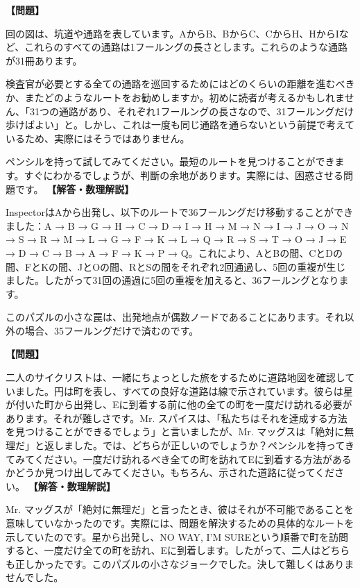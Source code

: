 \documentclass[10pt,a4paper,oneside,openany]{ltjsbook}
\begin{document}
\begin{tcolorbox}[colback=softblue,colframe=primaryblue,title=\textbf{第 247 問：INSPECTING A MINE.},arc=2mm,boxrule=1pt,breakable]
\textbf{【問題】}\par\vspace{0.3em}
回の図は、坑道や通路を表しています。AからB、BからC、CからH、HからIなど、これらのすべての通路は1フールングの長さとします。これらのような通路が31冊あります。

検査官が必要とする全ての通路を巡回するためにはどのくらいの距離を進むべきか、またどのようなルートをお勧めしますか。初めに読者が考えるかもしれません、「31つの通路があり、それぞれ1フールングの長さなので、31フールングだけ歩けばよい」と。しかし、これは一度も同じ通路を通らないという前提で考えているため、実際にはそうではありません。

ペンシルを持って試してみてください。最短のルートを見つけることができます。すぐにわかるでしょうが、判斷の余地があります。実際には、困惑させる問題です。
\tcblower
\textbf{【解答・数理解説】}\par\vspace{0.3em}
InspectorはAから出発し、以下のルートで36フールングだけ移動することができました：A → B → G → H → C → D → I → H → M → N → I → J → O → N → S → R → M → L → G → F → K → L → Q → R → S → T → O → J → E → D → C → B → A → F → K → P → Q。これにより、AとBの間、CとDの間、FとKの間、JとOの間、RとSの間をそれぞれ2回通過し、5回の重複が生じました。したがって31回の通過に5回の重複を加えると、36フールングとなります。

このパズルの小さな罠は、出発地点が偶数ノードであることにあります。それ以外の場合、35フールングだけで済むのです。
\end{tcolorbox}

\begin{tcolorbox}[colback=softblue,colframe=primaryblue,title=\textbf{第 248 問：サイクリストの旅 （原題: THE CYCLISTS' TOUR.）},arc=2mm,boxrule=1pt,breakable]
\textbf{【問題】}\par\vspace{0.3em}
二人のサイクリストは、一緒にちょっとした旅をするために道路地図を確認していました。円は町を表し、すべての良好な道路は線で示されています。彼らは星が付いた町から出発し、Eに到着する前に他の全ての町を一度だけ訪れる必要があります。それが難しさです。Mr. スパイスは、「私たちはそれを達成する方法を見つけることができるでしょう」と言いましたが、Mr. マッグスは「絶対に無理だ」と返しました。では、どちらが正しいのでしょうか？ペンシルを持ってきてみてください。一度だけ訪れるべき全ての町を訪れてEに到着する方法があるかどうか見つけ出してみてください。もちろん、示された道路に従ってください。
\tcblower
\textbf{【解答・数理解説】}\par\vspace{0.3em}
Mr. マッグスが「絶対に無理だ」と言ったとき、彼はそれが不可能であることを意味していなかったのです。実際には、問題を解決するための具体的なルートを示していたのです。星から出発し、NO WAY, I'M SUREという順番で町を訪問すると、一度だけ全ての町を訪れ、Eに到着します。したがって、二人はどちらも正しかったです。このパズルの小さなジョークでした。決して難しくはありませんでした。
\end{tcolorbox}
\end{document}
